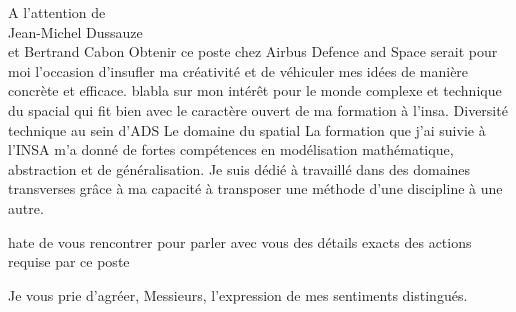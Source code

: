 \documentclass[12pt]{lettre}
\begin{document}
\begin{letter}{A l'attention de\\Jean-Michel Dussauze\\et Bertrand Cabon}
{%
Obtenir ce poste chez Airbus Defence and Space serait pour moi l'occasion
d'insufler ma créativité et de véhiculer mes idées de manière concrète et efficace.
blabla sur mon intérêt pour le monde complexe et technique du spacial qui fit
bien avec le caractère ouvert de ma formation à l'insa.
Diversité technique au sein d'ADS
Le domaine du spatial
La formation que j'ai suivie à l'INSA m'a donné de fortes compétences en
modélisation mathématique, abstraction et de généralisation.
Je suis dédié à travaillé dans des domaines transverses grâce à ma
capacité à transposer une méthode d'une discipline à une autre.
}

hate de vous rencontrer pour parler avec vous des détails exacts des actions
requise par ce poste

\closing{Je vous prie d'agréer, Messieurs, l'expression de mes sentiments distingués.}
\end{letter}
\end{document}
